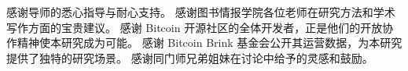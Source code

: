 
\printbibliography


\begin{acknowledgement}
感谢导师的悉心指导与耐心支持。
感谢图书情报学院各位老师在研究方法和学术写作方面的宝贵建议。
感谢 Bitcoin 开源社区的全体开发者，正是他们的开放协作精神使本研究成为可能。
感谢 Bitcoin Brink 基金会公开其运营数据，为本研究提供了独特的研究场景。
感谢同门师兄弟姐妹在讨论中给予的灵感和鼓励。
\end{acknowledgement}


